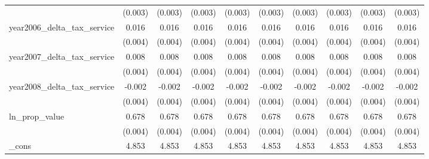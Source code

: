 {\begin{tabular}{l*{9}{c}}
            &     (0.003)         &     (0.003)         &     (0.003)         &     (0.003)         &     (0.003)         &     (0.003)         &     (0.003)         &     (0.003)         &     (0.003)         \\
[1em]
year2006_delta_tax_service&       0.016\sym{***}&       0.016\sym{***}&       0.016\sym{***}&       0.016\sym{***}&       0.016\sym{***}&       0.016\sym{***}&       0.016\sym{***}&       0.016\sym{***}&       0.016\sym{***}\\
            &     (0.004)         &     (0.004)         &     (0.004)         &     (0.004)         &     (0.004)         &     (0.004)         &     (0.004)         &     (0.004)         &     (0.004)         \\
[1em]
year2007_delta_tax_service&       0.008\sym{**} &       0.008\sym{**} &       0.008\sym{**} &       0.008\sym{**} &       0.008\sym{**} &       0.008\sym{**} &       0.008\sym{**} &       0.008\sym{**} &       0.008\sym{**} \\
            &     (0.004)         &     (0.004)         &     (0.004)         &     (0.004)         &     (0.004)         &     (0.004)         &     (0.004)         &     (0.004)         &     (0.004)         \\
[1em]
year2008_delta_tax_service&      -0.002         &      -0.002         &      -0.002         &      -0.002         &      -0.002         &      -0.002         &      -0.002         &      -0.002         &      -0.002         \\
            &     (0.004)         &     (0.004)         &     (0.004)         &     (0.004)         &     (0.004)         &     (0.004)         &     (0.004)         &     (0.004)         &     (0.004)         \\
[1em]
ln_prop_value&       0.678\sym{***}&       0.678\sym{***}&       0.678\sym{***}&       0.678\sym{***}&       0.678\sym{***}&       0.678\sym{***}&       0.678\sym{***}&       0.678\sym{***}&       0.678\sym{***}\\
            &     (0.004)         &     (0.004)         &     (0.004)         &     (0.004)         &     (0.004)         &     (0.004)         &     (0.004)         &     (0.004)         &     (0.004)         \\
[1em]
_cons       &       4.853\sym{***}&       4.853\sym{***}&       4.853\sym{***}&       4.853\sym{***}&       4.853\sym{***}&       4.853\sym{***}&       4.853\sym{***}&       4.853\sym{***}&       4.853\sym{***}\\

\end{tabular}}
